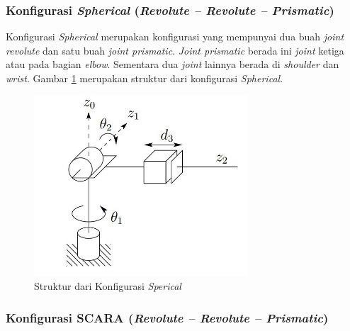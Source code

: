 \subsubsection{Konfigurasi \textit{Spherical} (\textit{Revolute – Revolute – Prismatic})} 

Konfigurasi \textit{Spherical} merupakan konfigurasi yang mempunyai dua buah \textit{joint revolute} dan satu buah \textit{joint prismatic}. \textit{Joint prismatic} berada ini \textit{joint} ketiga atau pada bagian \textit{elbow}. Sementara dua \textit{joint} lainnya berada di \textit{shoulder} dan \textit{wrist}. Gambar \ref{pic.spherical} merupakan struktur dari konfigurasi \textit{Spherical}.
	\begin{figure}[H]
	\centering
	\includegraphics[width=8cm]{gambar/spherical.jpg}
	\caption{Struktur dari Konfigurasi \textit{Sperical}\cite{Spong2006}}
	\label{pic.spherical}
\end{figure}


\subsubsection{Konfigurasi SCARA (\textit{Revolute – Revolute – Prismatic}) } 

